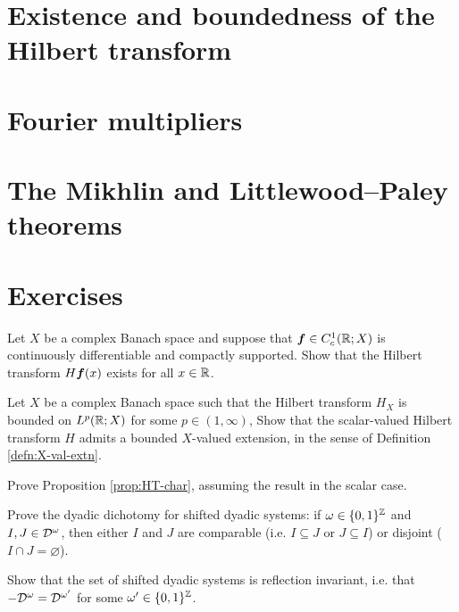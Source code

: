 \section{Existence and boundedness of the Hilbert transform}

\section{Fourier multipliers}

\section{The Mikhlin and Littlewood--Paley  theorems}

\section{Exercises}

\begin{exercise}\label{ex:HT-C1}
  Let $X$ be a complex Banach space and suppose that $\bm{f} \in C_{c}^1(\mathbb{R};X)$ is continuously differentiable and compactly supported.
  Show that the Hilbert transform $H\bm{f}(x)$ exists for all $x \in \mathbb{R}$.
\end{exercise}

\begin{exercise}
  Let $X$ be a complex Banach space such that the Hilbert transform $H_{X}$ is bounded on $L^p(\mathbb{R};X)$ for some $p \in (1,\infty)$,
  Show that the scalar-valued Hilbert transform $H$ admits a bounded $X$-valued extension, in the sense of Definition \ref{defn:X-val-extn}.
\end{exercise}

\begin{exercise}\label{ex:HT-char}
  Prove Proposition \ref{prop:HT-char}, assuming the result in the scalar case.
\end{exercise}

\begin{exercise}\label{ex:dyadic-dichotomy}
  Prove the dyadic dichotomy for shifted dyadic systems: if $\omega \in \{0,1\}^{\mathbb{Z}}$ and $I,J \in \mathcal{D}^{\omega}$, then either $I$ and $J$ are comparable (i.e. $I \subseteq J$ or $J \subseteq I$) or disjoint ($I \cap J = \varnothing$).
\end{exercise}

\begin{exercise}\label{ex:dyadic-refln-invariance}
  Show that the set of shifted dyadic systems is reflection invariant, i.e. that $-\mathcal{D}^{\omega} = \mathcal{D}^{\omega'}$ for some $\omega' \in \{0,1\}^{\mathbb{Z}}$.
\end{exercise}




